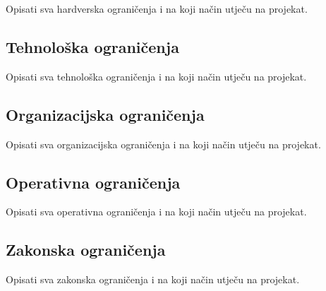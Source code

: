 Opisati sva hardverska ograničenja i na koji način utječu na projekat.

\sloppy
\subsection{Tehnološka ograničenja}

Opisati sva tehnološka ograničenja i na koji način utječu na projekat.

\sloppy
\subsection{Organizacijska ograničenja}

Opisati sva organizacijska ograničenja i na koji način utječu na projekat.

\sloppy
\subsection{Operativna ograničenja}

Opisati sva operativna ograničenja i na koji način utječu na projekat.

\sloppy
\subsection{Zakonska ograničenja}

Opisati sva zakonska ograničenja i na koji način utječu na projekat.